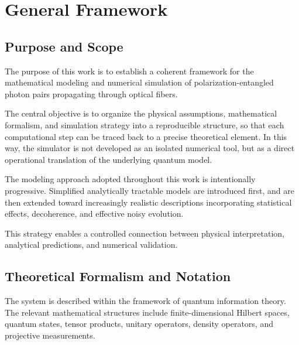 
\chapter{General Framework}


\section{Purpose and Scope}

The purpose of this work is to establish a coherent framework for the mathematical modeling and numerical simulation of polarization-entangled photon pairs propagating through optical fibers.

The central objective is to organize the physical assumptions, mathematical formalism, and simulation strategy into a reproducible structure, so that each computational step can be traced back to a precise theoretical element. In this way, the simulator is not developed as an isolated numerical tool, but as a direct operational translation of the underlying quantum model.

\medskip

The modeling approach adopted throughout this work is intentionally progressive. Simplified analytically tractable models are introduced first, and are then extended toward increasingly realistic descriptions incorporating statistical effects, decoherence, and effective noisy evolution.

This strategy enables a controlled connection between physical interpretation, analytical predictions, and numerical validation.


\section{Theoretical Formalism and Notation}

The system is described within the framework of quantum information theory. The relevant mathematical structures include finite-dimensional Hilbert spaces, quantum states, tensor products, unitary operators, density operators, and projective measurements.

